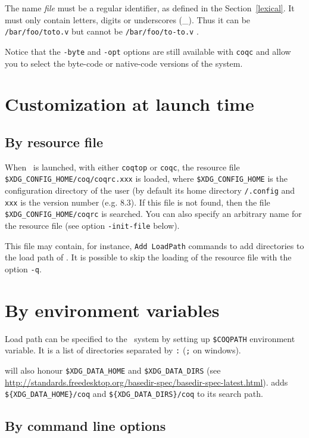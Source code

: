 \Warning The name {\em file} must be a regular {\Coq} identifier, as
defined in the Section~\ref{lexical}. It
must only contain letters, digits or underscores
(\_). Thus it can be \verb+/bar/foo/toto.v+ but cannot be
\verb+/bar/foo/to-to.v+ . 

Notice that the \verb!-byte! and \verb!-opt! options are still
available with \verb!coqc!  and allow you to select the byte-code or
native-code versions of the system.

\section[Customization]{Customization at launch time}

\subsection{By resource file}

When \Coq\ is launched, with either {\tt coqtop} or {\tt coqc}, the
resource file \verb:$XDG_CONFIG_HOME/coq/coqrc.xxx: is loaded, where
\verb:$XDG_CONFIG_HOME: is the configuration directory of the user (by
default its home directory \verb!/.config! and \verb:xxx: is the version
number (e.g. 8.3).  If this file is not found, then the file
\verb:$XDG_CONFIG_HOME/coqrc: is searched. You can also specify an
arbitrary name for the resource file (see option \verb:-init-file:
below).


This file may contain, for instance, \verb:Add LoadPath: commands to add
directories to the load path of \Coq.
It is possible to skip the loading of the resource file with the
option \verb:-q:.

\section{By environment variables\label{EnvVariables}
\label{envars}}

Load path can be specified to the \Coq\ system by setting up
\verb:$COQPATH: environment variable. It is a list of directories separated by \verb|:|
(\verb|;| on windows).

\Coq will also honour \verb:$XDG_DATA_HOME: and \verb:$XDG_DATA_DIRS: (see
\url{http://standards.freedesktop.org/basedir-spec/basedir-spec-latest.html}).
\Coq adds \verb:${XDG_DATA_HOME}/coq: and \verb:${XDG_DATA_DIRS}/coq: to its
search path.

\subsection{By command line options
\label{vmoption}
\label{coqoptions}}

